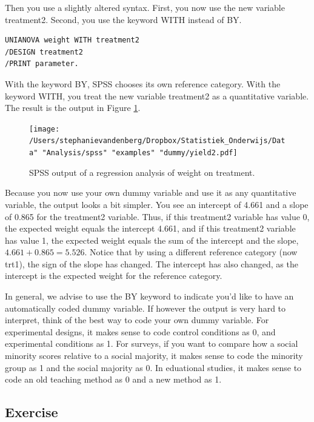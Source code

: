 \documentclass[]{report}\usepackage[]{graphicx}\usepackage[]{color}
\begin{document}
Then you use a slightly altered syntax. First, you now use the new variable treatment2. Second, you use the keyword WITH instead of BY.

\begin{verbatim}
UNIANOVA weight WITH treatment2 
/DESIGN treatment2
/PRINT parameter.
\end{verbatim}

With the keyword BY, SPSS chooses its own reference category. With the keyword WITH, you treat the new variable treatment2 as a quantitative variable. The result is the output in Figure \ref{fig:dummy_11}.


\begin{figure}[h]
    \begin{center}
       \texttt{[image: /Users/stephanievandenberg/Dropbox/Statistiek\_Onderwijs/Data" "Analysis/spss" "examples" "dummy/yield2.pdf]}
    \end{center}
 \caption{SPSS output of a regression analysis of weight on treatment.}
 \label{fig:dummy_11}
\end{figure}

Because you now use your own dummy variable and use it as any quantitative variable, the output looks a bit simpler. You see an intercept of 4.661 and a slope of 0.865 for the treatment2 variable. Thus, if this treatment2 variable has value 0, the expected weight equals the intercept 4.661, and if this treatment2 variable has value 1, the expected weight equals the sum of the intercept and the slope, $4.661 + 0.865 = 5.526$. Notice that by using a different reference category (now trt1), the sign of the slope has changed. The intercept has also changed, as the intercept is the expected weight for the reference category. 

In general, we advise to use the BY keyword to indicate you'd like to have an automatically coded dummy variable. If however the output is very hard to interpret, think of the best way to code your own dummy variable. For experimental designs, it makes sense to code control conditions as 0, and experimental conditions as 1. For surveys, if you want to compare how a social minority scores relative to a social majority, it makes sense to code the minority group as 1 and the social majority as 0. In eduational studies, it makes sense to code an old teaching method as 0 and a new method as 1.  

\subsection{Exercise}
\end{document}
